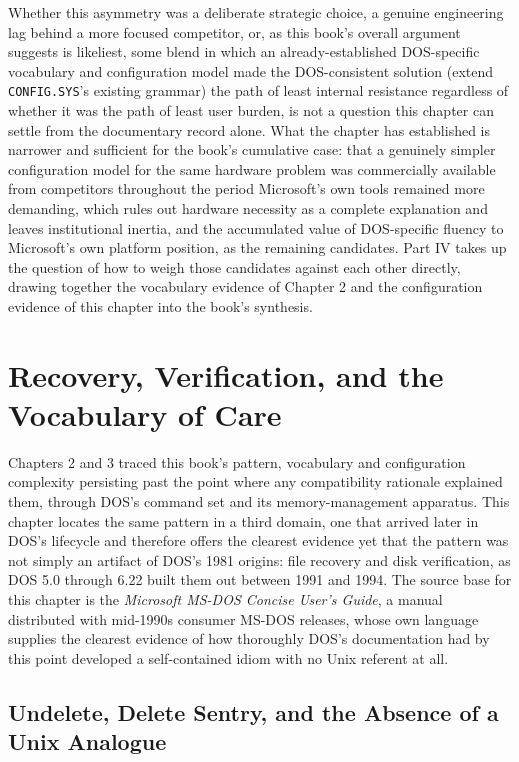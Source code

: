 \documentclass[11pt]{book}
\begin{document}
Whether this asymmetry was a deliberate strategic choice, a genuine engineering lag behind a more focused competitor, or, as this book's overall argument suggests is likeliest, some blend in which an already-established DOS-specific vocabulary and configuration model made the DOS-consistent solution (extend \texttt{CONFIG.SYS}'s existing grammar) the path of least internal resistance regardless of whether it was the path of least user burden, is not a question this chapter can settle from the documentary record alone. What the chapter has established is narrower and sufficient for the book's cumulative case: that a genuinely simpler configuration model for the same hardware problem was commercially available from competitors throughout the period Microsoft's own tools remained more demanding, which rules out hardware necessity as a complete explanation and leaves institutional inertia, and the accumulated value of DOS-specific fluency to Microsoft's own platform position, as the remaining candidates. Part IV takes up the question of how to weigh those candidates against each other directly, drawing together the vocabulary evidence of Chapter 2 and the configuration evidence of this chapter into the book's synthesis.

\chapter{Recovery, Verification, and the Vocabulary of Care}

Chapters 2 and 3 traced this book's pattern, vocabulary and configuration complexity persisting past the point where any compatibility rationale explained them, through DOS's command set and its memory-management apparatus. This chapter locates the same pattern in a third domain, one that arrived later in DOS's lifecycle and therefore offers the clearest evidence yet that the pattern was not simply an artifact of DOS's 1981 origins: file recovery and disk verification, as DOS 5.0 through 6.22 built them out between 1991 and 1994. The source base for this chapter is the \emph{Microsoft MS-DOS Concise User's Guide}, a manual distributed with mid-1990s consumer MS-DOS releases, whose own language supplies the clearest evidence of how thoroughly DOS's documentation had by this point developed a self-contained idiom with no Unix referent at all.

\section{Undelete, Delete Sentry, and the Absence of a Unix Analogue}
\end{document}
